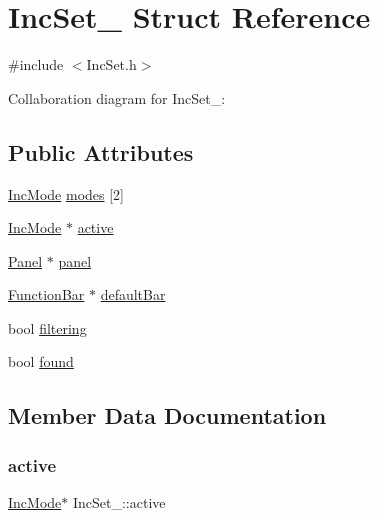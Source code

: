 \hypertarget{structIncSet__}{}\section{Inc\+Set\+\_\+ Struct Reference}
\label{structIncSet__}


{\ttfamily \#include $<$Inc\+Set.\+h$>$}



Collaboration diagram for Inc\+Set\+\_\+\+:
\subsection*{Public Attributes}
\begin{DoxyCompactItemize}
\item 
\hyperlink{IncSet_8h_a8b24215d6d25d0ec7df745f612e33960}{Inc\+Mode} \hyperlink{structIncSet___a4b7759bd0a433645a7856326d88603d9}{modes} \mbox{[}2\mbox{]}
\item 
\hyperlink{IncSet_8h_a8b24215d6d25d0ec7df745f612e33960}{Inc\+Mode} $\ast$ \hyperlink{structIncSet___aaeb12674cb5bdc376586436d7c9922d5}{active}
\item 
\hyperlink{Panel_8h_a034d4c16521db412dc7a1e8536d16fae}{Panel} $\ast$ \hyperlink{structIncSet___ae80c8103943b863882e6cbf32f6e3579}{panel}
\item 
\hyperlink{FunctionBar_8h_acbf21c40af2139c165bafd8061c2ceda}{Function\+Bar} $\ast$ \hyperlink{structIncSet___a16a99b2fe86fb1f37d8d2ec053281a9e}{default\+Bar}
\item 
bool \hyperlink{structIncSet___a024b80e5a3b2d481b35d1cdddea3675c}{filtering}
\item 
bool \hyperlink{structIncSet___a30d3df50f4de47583559cdea10f6ebd3}{found}
\end{DoxyCompactItemize}


\subsection{Member Data Documentation}
\mbox{\label{structIncSet___aaeb12674cb5bdc376586436d7c9922d5}} 
\subsubsection{\texorpdfstring{active}{active}}
{\footnotesize\ttfamily \hyperlink{IncSet_8h_a8b24215d6d25d0ec7df745f612e33960}{Inc\+Mode}$\ast$ Inc\+Set\+\_\+\+::active}


